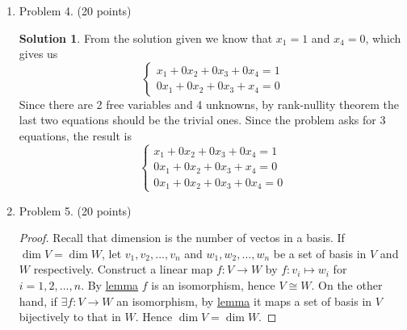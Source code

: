 \documentclass[]{book}
\theoremstyle{definition}
\newtheorem*{soln}{Solution}
\newcommand{\0}{\mathbf{0}}
\begin{document}
\begin{enumerate}
\item Problem 4. (20 points)
\begin{soln}
From the solution given we know that $x_1=1$ and $x_4=0$, which gives us
\begin{equation*}
\begin{cases}
x_1+0x_2+0x_3+0x_4=1\\
0x_1+0x_2+0x_3+x_4=0
\end{cases}
\end{equation*}
Since there are 2 free variables and 4 unknowns, by rank-nullity theorem the last two equations should be the trivial ones. Since the problem asks for 3 equations, the result is
\begin{equation*}
\begin{cases}
x_1+0x_2+0x_3+0x_4=1\\
0x_1+0x_2+0x_3+x_4=0\\
0x_1+0x_2+0x_3+0x_4=0
\end{cases}
\end{equation*}
\end{soln}

\item Problem 5. (20 points)
\begin{proof}
Recall that dimension is the number of vectos in a basis.\smallbreak
If $\dim V=\dim W$, let $v_1,v_2,...,v_n$ and $w_1,w_2,...,w_n$ be a set of basis in $V$ and $W$ respectively. Construct a linear map $f:V\to W$ by $f:v_i\mapsto w_i$ for $i=1,2,...,n$. By \hyperref[lemma]{lemma} $f$ is an isomorphism, hence $V\cong W$.\smallbreak
On the other hand, if $\exists f:V\to W$ an isomorphism, by \hyperref[lemma]{lemma} it maps a set of basis in $V$ bijectively to that in $W$. Hence $\dim V=\dim W$.
\end{proof}


\end{enumerate}
\end{document}
